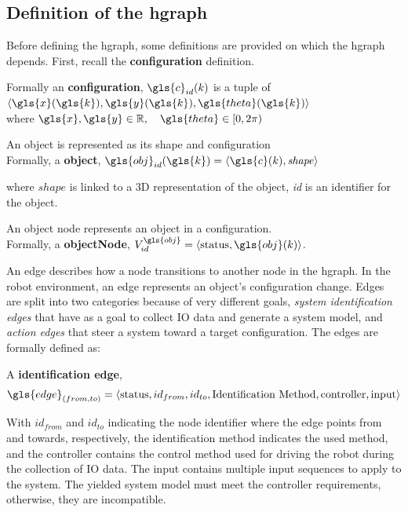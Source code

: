 \subsection{Definition of the \ac{hgraph}}%
\label{subsec:hgraph_definition}%
Before defining the \ac{hgraph}, some definitions are provided on which the \ac{hgraph} depends. First, recall the \textbf{configuration} definition.\bs

Formally an \textbf{configuration}, $\gls{c}_{id}(k)$ is a tuple of $\left\langle \gls{x}(\gls{k}), \gls{y}(\gls{k}), \gls{theta}(\gls{k})\right\rangle$\\ where $\gls{x}, \gls{y} \in \mathbb{R}, \quad  \gls{theta} \in [0, 2\pi)$\bs

An object is represented as its shape and configuration\\Formally, a \textbf{object},  $\gls{obj}_{id}(\gls{k}) = \left\langle \gls{c}(k), \mathit{shape} \right\rangle $\bs

where $\mathit{shape}$ is linked to a 3D representation of the object, \textit{id} is an identifier for the object.\bs

An object node represents an object in a configuration.\\Formally, a \textbf{objectNode}, $V^{\gls{obj}}_{id} =\left\langle \textrm{status}, \gls{obj}(k)\right\rangle $.\bs

An edge describes how a node transitions to another node in the \ac{hgraph}. In the robot environment, an edge represents an object's configuration change. Edges are split into two categories because of very different goals, \textit{system identification edges} that have as a goal to collect \ac{IO} data and generate a system model, and \textit{action edges} that steer a system toward a target configuration. The edges are formally defined as:\bs

A \textbf{identification edge}, \[\gls{edge}_{(from, to)} = \left\langle \textrm{status}, id_{from}, id_{to}, \textrm{Identification Method}, \textrm{controller}, \textrm{input}\right\rangle\]\bs

With $id_{from}$ and $id_{to}$ indicating the node identifier where the edge points from and towards, respectively, the identification method indicates the used method, and the controller contains the control method used for driving the robot during the collection of \ac{IO} data. The input contains multiple input sequences to apply to the system. The yielded system model must meet the controller requirements, otherwise, they are incompatible.\bs

